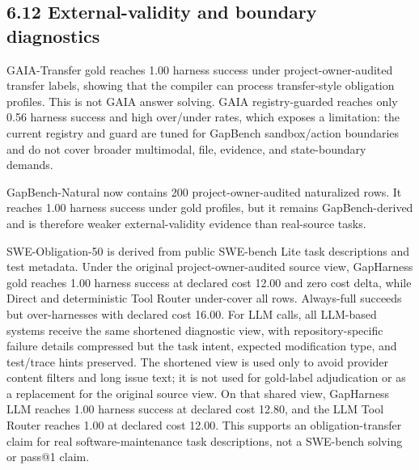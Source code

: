 \documentclass[
  10pt,
]{article}
\begin{document}
\subsection{6.12 External-validity and boundary
diagnostics}\label{external-validity-and-boundary-diagnostics}

GAIA-Transfer gold reaches 1.00 harness success under
project-owner-audited transfer labels, showing that the compiler can
process transfer-style obligation profiles. This is not GAIA answer
solving. GAIA registry-guarded reaches only 0.56 harness success and
high over/under rates, which exposes a limitation: the current registry
and guard are tuned for GapBench sandbox/action boundaries and do not
cover broader multimodal, file, evidence, and state-boundary demands.

GapBench-Natural now contains 200 project-owner-audited naturalized
rows. It reaches 1.00 harness success under gold profiles, but it
remains GapBench-derived and is therefore weaker external-validity
evidence than real-source tasks.

SWE-Obligation-50 is derived from public SWE-bench Lite task
descriptions and test metadata. Under the original project-owner-audited
source view, GapHarness gold reaches 1.00 harness success at declared
cost 12.00 and zero cost delta, while Direct and deterministic Tool
Router under-cover all rows. Always-full succeeds but over-harnesses
with declared cost 16.00. For LLM calls, all LLM-based systems receive
the same shortened diagnostic view, with repository-specific failure
details compressed but the task intent, expected modification type, and
test/trace hints preserved. The shortened view is used only to avoid
provider content filters and long issue text; it is not used for
gold-label adjudication or as a replacement for the original source
view. On that shared view, GapHarness LLM reaches 1.00 harness success
at declared cost 12.80, and the LLM Tool Router reaches 1.00 at declared
cost 12.00. This supports an obligation-transfer claim for real
software-maintenance task descriptions, not a SWE-bench solving or
pass@1 claim.
\end{document}
